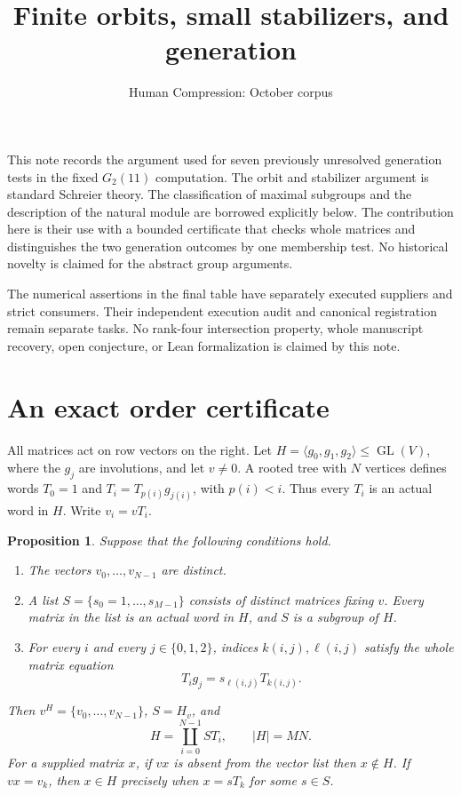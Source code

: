 \documentclass[11pt]{article}
\title{Finite orbits, small stabilizers, and generation}
\author{Human Compression: October corpus}
\date{}
\newtheorem{proposition}{Proposition}
\newcommand{\old}{\marginpar{\scriptsize\textsf{Earlier theory}}}
\begin{document}
\maketitle

This note records the argument used for seven previously unresolved
generation tests in the fixed $G_2(11)$ computation. The orbit and
stabilizer argument is standard Schreier theory. The classification of
maximal subgroups and the description of the natural module are borrowed
explicitly below. The contribution here is their use with a bounded
certificate that checks whole matrices and distinguishes the two
generation outcomes by one membership test. No historical novelty is
claimed for the abstract group arguments.

The numerical assertions in the final table have separately executed
suppliers and strict consumers. Their independent execution audit and
canonical registration remain separate tasks. No rank-four intersection
property, whole manuscript recovery, open conjecture, or Lean
formalization is claimed by this note.

\section{An exact order certificate}

All matrices act on row vectors on the right. Let
$H=\langle g_0,g_1,g_2\rangle\leq\operatorname{GL}(V)$, where the $g_j$
are involutions, and let $v\ne0$. A rooted tree with $N$ vertices defines
words $T_0=1$ and $T_i=T_{p(i)}g_{j(i)}$, with $p(i)<i$.
Thus every $T_i$ is an actual word in $H$. Write $v_i=vT_i$.

\begin{proposition}\label{prop:certificate}\old
Suppose that the following conditions hold.
\begin{enumerate}
\item The vectors $v_0,\ldots,v_{N-1}$ are distinct.
\item A list $S=\{s_0=1,\ldots,s_{M-1}\}$ consists of distinct matrices
      fixing $v$. Every matrix in the list is an actual word in $H$,
      and $S$ is a subgroup of $H$.
\item For every $i$ and every $j\in\{0,1,2\}$, indices
      $k(i,j),\ell(i,j)$ satisfy the whole matrix equation
      \[
           T_i g_j=s_{\ell(i,j)}T_{k(i,j)}.
      \]
\end{enumerate}
Then $v^H=\{v_0,\ldots,v_{N-1}\}$, $S=H_v$, and
\[
                   H=\coprod_{i=0}^{N-1}S T_i,
                   \qquad |H|=MN.
\]
For a supplied matrix $x$, if $vx$ is absent from the vector list then
$x\notin H$. If $vx=v_k$, then $x\in H$ precisely when
$x=sT_k$ for some $s\in S$.
\end{proposition}
\end{document}
